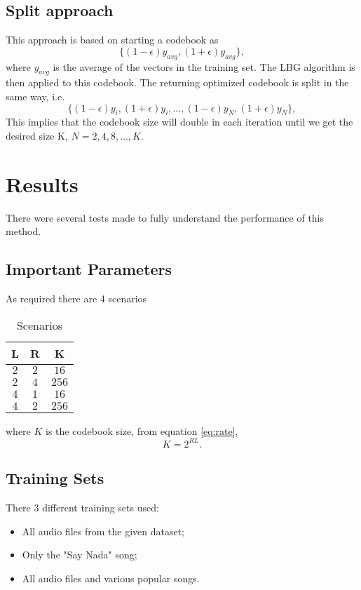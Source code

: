 \documentclass[a4paper, 11pt]{article}
\begin{document}
		\subsection{Split approach}
				This approach is based on starting a codebook as 
				\begin{equation}
					\{(1-\epsilon)y_{avg}, (1+\epsilon)y_{avg}\},
				\end{equation}
				where $ y_{avg} $ is the average of the vectors in the training set.
				The LBG algorithm is then applied to this codebook.
				The returning optimized codebook is split in the same way, i.e.
				\begin{equation}
					\{(1-\epsilon)y_i, (1+\epsilon)y_i, \ldots, (1-\epsilon)y_N, (1+\epsilon)y_N \}, 
				\end{equation}
				This implies that the codebook size will double in each iteration until we get the desired size K, $ N=2,4,8, \ldots,K $.			
		
	
	\section{Results}
		There were several tests made to fully understand the performance of this method.
		
		\subsection{Important Parameters}
			As required there are 4 scenarios
			\begin{table}[H]
				\centering
				\begin{tabular}{c|c|c}
					\textbf{L} 		& \textbf{R} 	& \textbf{K} 	\\ \hline
					$ 2 $			& $ 2 $ 		& $ 16 $	  	\\ \hline
					$ 2 $			& $ 4 $ 	  	& $ 256 $ 		\\ \hline	
					$ 4 $			& $ 1 $ 		& $ 16 $ 		\\ \hline	
					$ 4 $			& $ 2 $			& $	256 $ 		\\
				\end{tabular}
				\caption{Scenarios}
				\label{table:Scenarios}
			\end{table}
			where $ K $ is the codebook size, from equation \ref{eq:rate},
			\begin{equation}
				K = 2^{RL}.
			\end{equation} 
		
		
		\subsection{Training Sets}
			There 3 different training sets used:
			\begin{itemize}
				\item All audio files from the given dataset;
				\item Only the "Say Nada" song;
				\item All audio files and various popular songs.
			\end{itemize}
				
\end{document}
